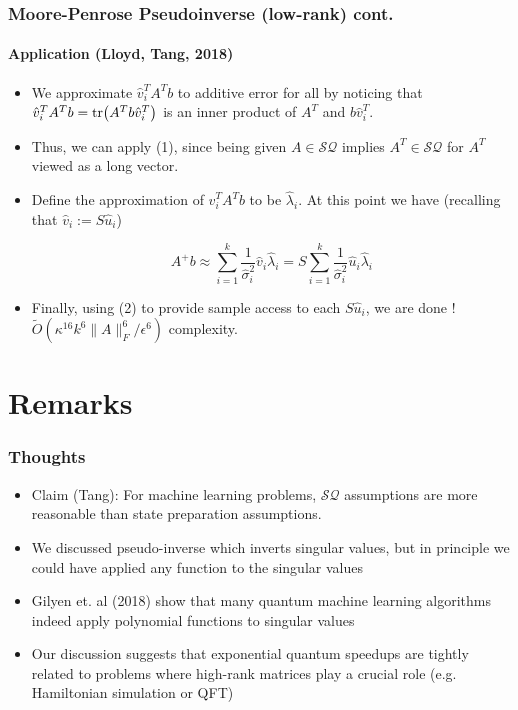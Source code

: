 \documentclass{beamer}
\newcommand\0{\mathbf{0}}
\newcommand\<{\langle}
\renewcommand\>{\rangle}
\begin{document}
\begin{frame}
\frametitle{Moore-Penrose Pseudoinverse (low-rank) cont.} 	
\framesubtitle{Application (Lloyd, Tang, 2018)}
\begin{itemize}
\item We approximate $\hat{v}_i^TA^Tb$ to additive error for all by noticing that $\hat{v}_i^TA^Tb = \tr(A^Tb\hat{v}_i^T)$ is an inner product of $A^T$ and $b\hat{v}_i^T$. 
\item Thus, we can apply (1), since being given $A \in \mathcal{SQ}$ implies $A^T \in \mathcal{SQ}$ for $A^T$ viewed as a long vector. 
\item Define the approximation of $\hat{v}_i^TA^Tb$ to be $\hat{\lambda}_i$. At this point we have (recalling that $\hat{v}_i := S\hat{u}_i$)

$$A^+b \approx \sum_{i=1}^k \frac{1}{\hat{\sigma}_i^2}\hat{v}_i\hat{\lambda}_i = S \sum_{i=1}^k \frac{1}{\hat{\sigma}_i^2}\hat{u}_i\hat{\lambda}_i$$

\item Finally, using (2) to provide sample access to each $S \hat{u}_i$, we are done	! $\tilde{O}(\kappa^{16}k^6 \|A\|^6_F / \epsilon^6)$ complexity.
\end{itemize}
\end{frame}

\section{Remarks}

\begin{frame}
\frametitle{Thoughts}	

\begin{itemize}
\item Claim (Tang): For machine learning problems, $\mathcal{SQ}$ assumptions are more reasonable than state preparation assumptions.
\item We discussed pseudo-inverse which inverts singular values, but in principle we could have applied any function to the singular values
\item Gilyen et. al (2018) show that many quantum machine learning algorithms indeed apply polynomial functions to singular values
\item Our discussion suggests that exponential quantum speedups are tightly related to problems where high-rank matrices play a crucial role (e.g. Hamiltonian simulation or QFT)
\end{itemize}
\end{frame}
\end{document}
